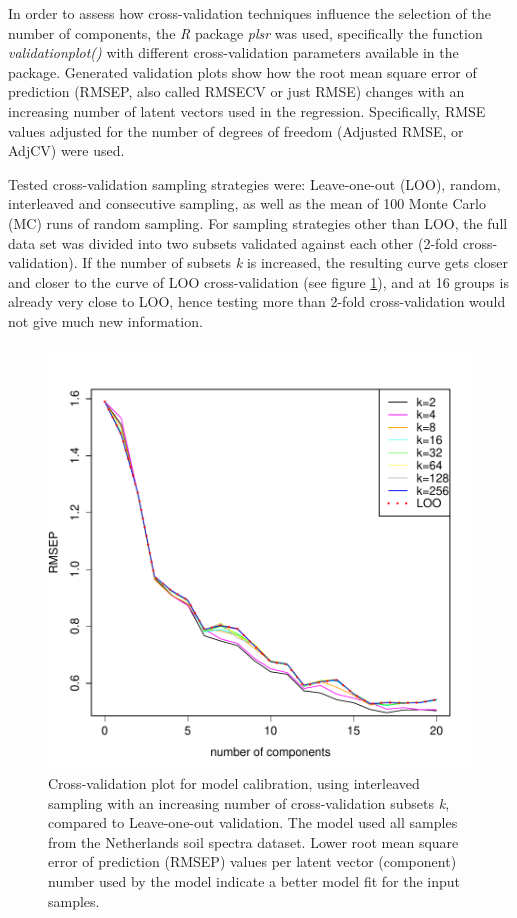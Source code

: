 \documentclass{isprs}
\begin{document}
In order to assess how cross-validation techniques influence the selection of the number of components, the \textit{R} package \textit{plsr} was used, specifically the function \textit{validationplot()} with different cross-validation parameters available in the package. Generated validation plots show how the root mean square error of prediction (RMSEP, also called RMSECV or just RMSE) changes with an increasing number of latent vectors used in the regression. Specifically, RMSE values adjusted for the number of degrees of freedom (Adjusted RMSE, or AdjCV) were used.

Tested cross-validation sampling strategies were: Leave-one-out (LOO), random, interleaved and consecutive sampling, as well as the mean of 100 Monte Carlo (MC) runs of random sampling. For sampling strategies other than LOO, the full data set was divided into two subsets validated against each other (2-fold cross-validation). If the number of subsets \textit{k} is increased, the resulting curve gets closer and closer to the curve of LOO cross-validation (see figure \ref{fig:interleaved-group-sizes}), and at 16 groups is already very close to LOO, hence testing more than 2-fold cross-validation would not give much new information.

\begin{figure}[ht!]
\includegraphics[width=1.0\columnwidth]{../script/output/interleaved-group-sizes.pdf}
\begin{center}
    \caption{Cross-validation plot for model calibration, using interleaved sampling with an increasing number of cross-validation subsets \textit{k}, compared to Leave-one-out validation. The model used all samples from the Netherlands soil spectra dataset. Lower root mean square error of prediction (RMSEP) values per latent vector (component) number used by the model indicate a better model fit for the input samples.}
    \label{fig:interleaved-group-sizes}
\end{center}
\end{figure}
\end{document}
